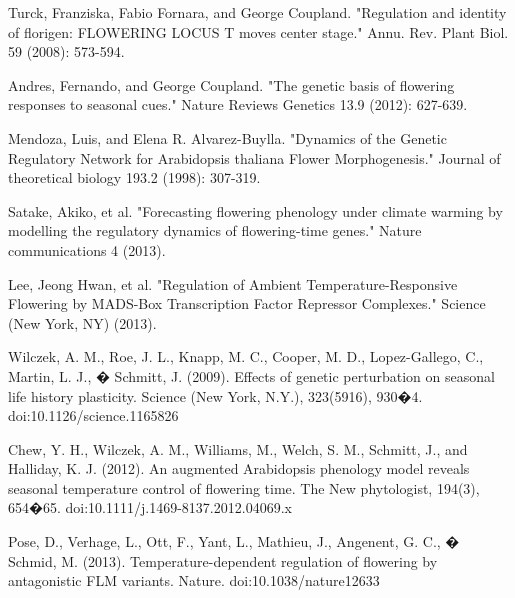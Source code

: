 \documentclass[paper=a4, fontsize=12pt]{scrartcl}	%
\numberwithin{equation}{section}					%
\numberwithin{figure}{section}					%
\numberwithin{table}{section}					%
\begin{document}
\begin{thebibliography}{99}

Turck, Franziska, Fabio Fornara, and George Coupland. "Regulation and identity of florigen: FLOWERING LOCUS T moves center stage." Annu. Rev. Plant Biol. 59 (2008): 573-594.

Andres, Fernando, and George Coupland. "The genetic basis of flowering responses to seasonal cues." Nature Reviews Genetics 13.9 (2012): 627-639.

Mendoza, Luis, and Elena R. Alvarez-Buylla. "Dynamics of the Genetic Regulatory Network for Arabidopsis thaliana Flower Morphogenesis." Journal of theoretical biology 193.2 (1998): 307-319.

Satake, Akiko, et al. "Forecasting flowering phenology under climate warming by modelling the regulatory dynamics of flowering-time genes." Nature communications 4 (2013).

Lee, Jeong Hwan, et al. "Regulation of Ambient Temperature-Responsive Flowering by MADS-Box Transcription Factor Repressor Complexes." Science (New York, NY) (2013).

Wilczek, A. M., Roe, J. L., Knapp, M. C., Cooper, M. D., Lopez-Gallego, C., Martin, L. J., � Schmitt, J. (2009). Effects of genetic perturbation on seasonal life history plasticity. Science (New York, N.Y.), 323(5916), 930�4. doi:10.1126/science.1165826

Chew, Y. H., Wilczek, A. M., Williams, M., Welch, S. M., Schmitt, J., and Halliday, K. J. (2012). An augmented Arabidopsis phenology model reveals seasonal temperature control of flowering time. The New phytologist, 194(3), 654�65. doi:10.1111/j.1469-8137.2012.04069.x

Pose, D., Verhage, L., Ott, F., Yant, L., Mathieu, J., Angenent, G. C., � Schmid, M. (2013). Temperature-dependent regulation of flowering by antagonistic FLM variants. Nature. doi:10.1038/nature12633

\end{thebibliography}

%
\end{document}
